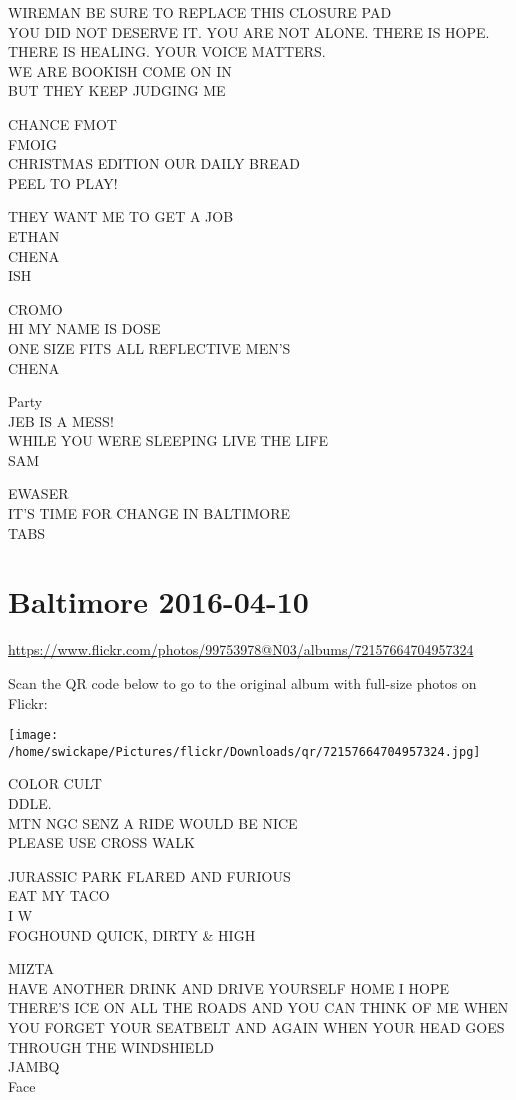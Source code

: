 \documentclass[10pt,letterpaper]{article}
\begin{document}
WIREMAN BE SURE TO REPLACE THIS CLOSURE PAD\\
YOU DID NOT DESERVE IT. YOU ARE NOT ALONE. THERE IS HOPE. THERE IS HEALING. YOUR VOICE MATTERS.\\
WE ARE BOOKISH COME ON IN\\
BUT THEY KEEP JUDGING ME

CHANCE FMOT\\
FMOIG\\
CHRISTMAS EDITION OUR DAILY BREAD\\
PEEL TO PLAY!

THEY WANT ME TO GET A JOB\\
ETHAN\\
CHENA\\
ISH

CROMO\\
HI MY NAME IS DOSE\\
ONE SIZE FITS ALL REFLECTIVE MEN'S\\
CHENA

Party\\
JEB IS A MESS!\\
WHILE YOU WERE SLEEPING LIVE THE LIFE\\
SAM

EWASER\\
IT'S TIME FOR CHANGE IN BALTIMORE\\
TABS


\section*{Baltimore 2016-04-10}

\url{https://www.flickr.com/photos/99753978@N03/albums/72157664704957324}

Scan the QR code below to go to the original album with full-size photos on Flickr:

\texttt{[image: /home/swickape/Pictures/flickr/Downloads/qr/72157664704957324.jpg]}


COLOR CULT\\
DDLE.\\
MTN NGC SENZ A RIDE WOULD BE NICE\\
PLEASE USE CROSS WALK

JURASSIC PARK FLARED AND FURIOUS\\
EAT MY TACO\\
I W\\
FOGHOUND QUICK, DIRTY \& HIGH

MIZTA\\
HAVE ANOTHER DRINK AND DRIVE YOURSELF HOME I HOPE THERE'S ICE ON ALL THE ROADS AND YOU CAN THINK OF ME WHEN YOU FORGET YOUR SEATBELT AND AGAIN WHEN YOUR HEAD GOES THROUGH THE WINDSHIELD\\
JAMBQ\\
Face
\end{document}
